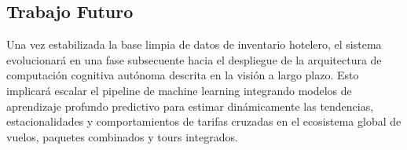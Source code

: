 \documentclass[11pt,a4paper]{article}
\begin{document}
\subsection{Trabajo Futuro}
Una vez estabilizada la base limpia de datos de inventario hotelero, el sistema evolucionará en una fase subsecuente hacia el despliegue de la arquitectura de computación cognitiva autónoma descrita en la visión a largo plazo. Esto implicará escalar el pipeline de machine learning integrando modelos de aprendizaje profundo predictivo para estimar dinámicamente las tendencias, estacionalidades y comportamientos de tarifas cruzadas en el ecosistema global de vuelos, paquetes combinados y tours integrados.
\end{document}
